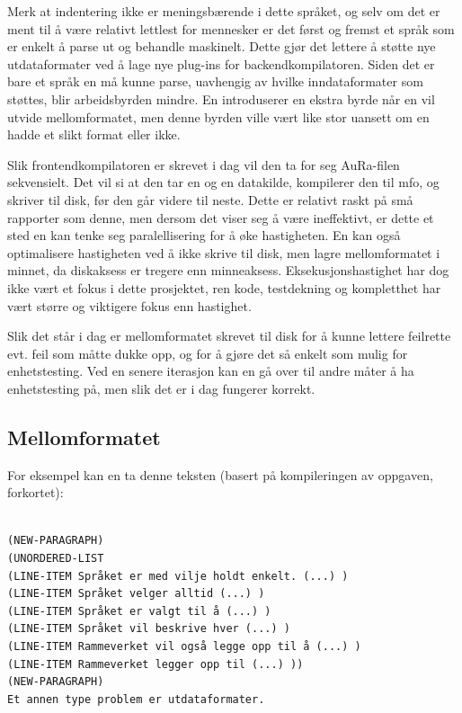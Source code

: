 \documentclass[norsk, 11pt, a4paper]{article}
\begin{document}
Merk at indentering ikke er meningsbærende i dette språket, og selv om det er ment til å være relativt lettlest for mennesker er det først og fremst et språk som er enkelt å parse ut og behandle maskinelt. 
Dette gjør det lettere å støtte nye utdataformater ved å lage nye plug-ins for backendkompilatoren. 
Siden det er bare et språk en må kunne parse, uavhengig av hvilke inndataformater som støttes, blir arbeidsbyrden mindre. 
En introduserer en ekstra byrde når en vil utvide mellomformatet, men denne byrden ville vært like stor uansett om en hadde et slikt format eller ikke.



Slik frontendkompilatoren er skrevet i dag vil den ta for seg AuRa-filen sekvensielt.
Det vil si at den tar en og en datakilde, kompilerer den til mfo, og skriver til disk, før den går videre til neste. 
Dette er relativt raskt på små rapporter som denne, men dersom det viser seg å være ineffektivt, er dette et sted en kan tenke seg paralellisering for å øke hastigheten. 
En kan også optimalisere hastigheten ved å ikke skrive til disk, men lagre mellomformatet i minnet, da diskaksess er tregere enn minneaksess. 
Eksekusjonshastighet har dog ikke vært et fokus i dette prosjektet, ren kode, testdekning og kompletthet har vært større og viktigere fokus enn hastighet.

Slik det står i dag er mellomformatet skrevet til disk for å kunne lettere feilrette evt. feil som måtte dukke opp, og for å gjøre det så enkelt som mulig for enhetstesting. Ved en senere iterasjon kan en gå over til andre måter å ha enhetstesting på, men slik det er i dag fungerer korrekt.

\subsection{Mellomformatet}

For eksempel kan en ta denne teksten (basert på kompileringen av oppgaven, forkortet):

\lstset{language=Lisp}
\begin{lstlisting}

(NEW-PARAGRAPH)
(UNORDERED-LIST
(LINE-ITEM Språket er med vilje holdt enkelt. (...) )
(LINE-ITEM Språket velger alltid (...) )
(LINE-ITEM Språket er valgt til å (...) )
(LINE-ITEM Språket vil beskrive hver (...) )
(LINE-ITEM Rammeverket vil også legge opp til å (...) )
(LINE-ITEM Rammeverket legger opp til (...) ))
(NEW-PARAGRAPH)
Et annen type problem er utdataformater.
\end{lstlisting}
\end{document}
